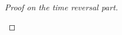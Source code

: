 \begin{proof}[Proof on the time reversal part]
\begin{itemize}
\begin{itemize}
\end{itemize}





\end{itemize}
\end{proof}
























